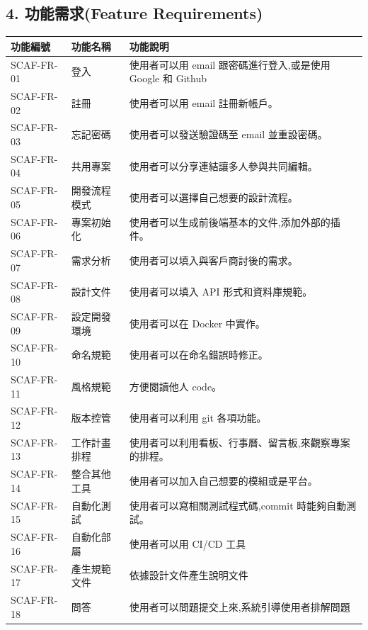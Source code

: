 \documentclass{report}
\begin{document}
\subsection*{4. 功能需求(Feature Requirements)}

\begin{tabularx}{\textwidth}{
  |p{}%
  |p{}%
  |p{}|%
}
  \hline
  功能編號 & 功能名稱 & 功能說明 \\ \hline
  SCAF-FR-01 & 登入 & 使用者可以用 email 跟密碼進行登入,或是使用 Google 和 Github \\ \hline
  SCAF-FR-02 & 註冊 & 使用者可以用 email 註冊新帳戶。 \\ \hline
  SCAF-FR-03 & 忘記密碼 & 使用者可以發送驗證碼至 email 並重設密碼。 \\ \hline
  SCAF-FR-04 & 共用專案 & 使用者可以分享連結讓多人參與共同編輯。 \\ \hline
  SCAF-FR-05 & 開發流程模式 & 使用者可以選擇自己想要的設計流程。 \\ \hline
  SCAF-FR-06 & 專案初始化 & 使用者可以生成前後端基本的文件,添加外部的插件。 \\ \hline
  SCAF-FR-07 & 需求分析 & 使用者可以填入與客戶商討後的需求。 \\ \hline
  SCAF-FR-08 & 設計文件 & 使用者可以填入 API 形式和資料庫規範。 \\ \hline
  SCAF-FR-09 & 設定開發環境 & 使用者可以在 Docker 中實作。 \\ \hline
  SCAF-FR-10 & 命名規範 & 使用者可以在命名錯誤時修正。 \\ \hline
  SCAF-FR-11 & 風格規範 & 方便閱讀他人 code。 \\ \hline
  SCAF-FR-12 & 版本控管 & 使用者可以利用 git 各項功能。 \\ \hline
  SCAF-FR-13 & 工作計畫排程 & 使用者可以利用看板、行事曆、留言板,來觀察專案的排程。 \\ \hline
  SCAF-FR-14 & 整合其他工具 & 使用者可以加入自己想要的模組或是平台。 \\ \hline
  SCAF-FR-15 & 自動化測試 & 使用者可以寫相關測試程式碼,commit 時能夠自動測試。 \\ \hline
  SCAF-FR-16 & 自動化部屬 & 使用者可以用 CI/CD 工具 \\ \hline
  SCAF-FR-17 & 產生規範文件 & 依據設計文件產生說明文件 \\ \hline
  SCAF-FR-18 & 問答 & 使用者可以問題提交上來,系統引導使用者排解問題 \\ \hline
\end{tabularx}
\end{document}
